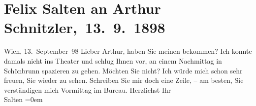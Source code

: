 

         \renewcommand{\erwaehnteInstitutionen}{Institutionen: Wiener Allgemeine Zeitung}
         \renewcommand{\erwaehnteOrte}{Orte: Schlosspark Schönbrunn, Wien}
         \renewcommand{\erwaehnteWerke}{}
               \section[ Felix Salten an Arthur Schnitzler, 13. 9. 1898]{ Felix Salten an Arthur Schnitzler, 13. 9. 1898}\nopagebreak{}\rehead{ }\begin{ledgroupsized}[t]{13cm}\normalsize\beginnumbering \toendnotes[C]{\smallbreak\pagebreak[2]} 
\toendnotes[C]{\smallbreak}\pstart
           \raggedleft{}{\pb}Wien, 13. September 98\pend
           \pstart
           Lieber Arthur, haben Sie meinen \label{K_L03283-1v}\label{K_L03283-1h} bekommen? Ich konnte damals nicht ins Theater und schlug Ihnen vor, an einem
               Nachmittag in Schönbrunn spazieren zu gehen.
               Möchten Sie nicht? Ich würde mich schon sehr freuen, Sie wieder zu sehen. Schreiben
               Sie mir doch eine Zeile, – am besten, Sie verständigen mich Vormittag im
                  Bureau.\pend
           \pstart
           Herzlichst Ihr {\\[\baselineskip]}\spacefill\mbox{Salten}\pend
           \leftskip=0em{}
         
         \endnumbering{}\end{ledgroupsized}  \newcommand{\dateiname}{L03283}\newcommand{\titel}{Felix Salten an Arthur Schnitzler, 13. 9. 1898}\newcommand{\editorInnen}{Martin Anton Müller und Laura Untner}
      